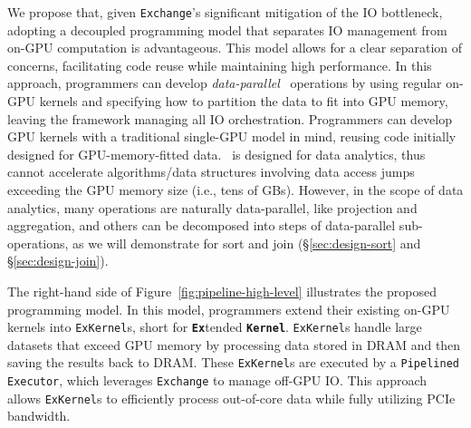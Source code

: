 We propose that, given \texttt{Exchange}'s significant mitigation of the IO bottleneck, adopting a decoupled programming model that separates IO management from on-GPU computation is advantageous. 
This model allows for a clear separation of concerns, facilitating code reuse while maintaining high performance.
In this approach, programmers can develop \textit{data-parallel}~\cite{data-parallel} operations by using regular on-GPU kernels and specifying how to partition the data to fit into GPU memory, leaving the framework managing all IO orchestration.
Programmers can develop GPU kernels with a traditional single-GPU model in mind, reusing code initially designed for GPU-memory-fitted data. 
\THISWORK\ is designed for data analytics, thus cannot accelerate algorithms/data structures involving data access jumps exceeding the GPU memory size (i.e., tens of GBs).
However, in the scope of data analytics, many operations are naturally data-parallel, like projection and aggregation, and others can be decomposed into steps of data-parallel sub-operations, as we will demonstrate for sort and join (\S\ref{sec:design-sort} and \S\ref{sec:design-join}).

The right-hand side of Figure~\ref{fig:pipeline-high-level} illustrates the proposed programming model. 
In this model, programmers extend their existing on-GPU kernels into \texttt{ExKernel}s, short for \texttt{\textbf{Ex}}tended \texttt{\textbf{Kernel}}.
\texttt{ExKernel}s handle large datasets that exceed GPU memory by processing data stored in DRAM and then saving the results back to DRAM. 
These \texttt{ExKernel}s are executed by a \texttt{Pipelined Executor}, which leverages \texttt{Exchange} to manage off-GPU IO. 
This approach allows \texttt{ExKernel}s to efficiently process out-of-core data while fully utilizing PCIe bandwidth.

